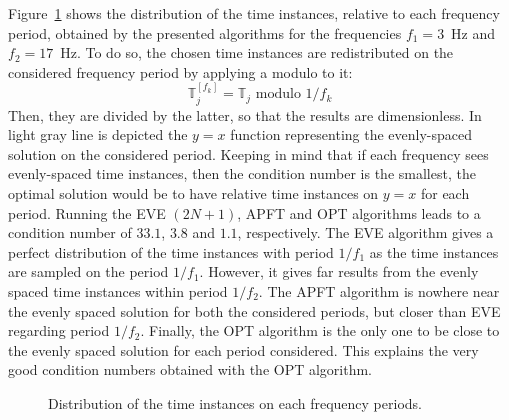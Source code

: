 Figure~\ref{fig:distribution_tlv} shows the distribution of the time
instances, relative to each frequency period, obtained by the presented
algorithms for the frequencies $f_1 = 3$~Hz and $f_2 = 17$~Hz. 
To do so, the chosen time instances are redistributed
on the considered frequency period by applying a modulo to it:
\begin{equation}
  \label{eq:1}
  \mathbb{T}^{[f_k]}_j =  \mathbb{T}_j \text{ modulo } 1/f_k
\end{equation}
Then, they are divided by the latter, so that the results are
dimensionless.  In light gray line is depicted the $y=x$ function
representing the evenly-spaced solution on the considered period.
Keeping in mind that if each frequency sees evenly-spaced time instances,
then the condition number is the smallest, the optimal solution would
be to have relative time instances on $y=x$ for each period.  Running the
EVE $(2N + 1)$, APFT and OPT algorithms leads to a condition number of $33.1$,
$3.8$ and $1.1$, respectively.  The EVE algorithm gives a perfect distribution
of the time instances with
period $1/f_1$ as the time instances are sampled on the period
$1/f_1$. However, it gives far results from the evenly spaced time instances
within period $1/f_2$. The APFT algorithm is nowhere near the evenly spaced
solution for both the considered periods, but closer than EVE regarding
period $1/f_2$. Finally, the OPT algorithm is the only one to be close
to the evenly spaced solution for each period considered. This explains the
very good condition numbers obtained with the OPT algorithm.
\begin{figure}[htb]
  \centering 
  \caption{Distribution of the time instances on each frequency periods.}
  \label{fig:distribution_tlv}
\end{figure}
